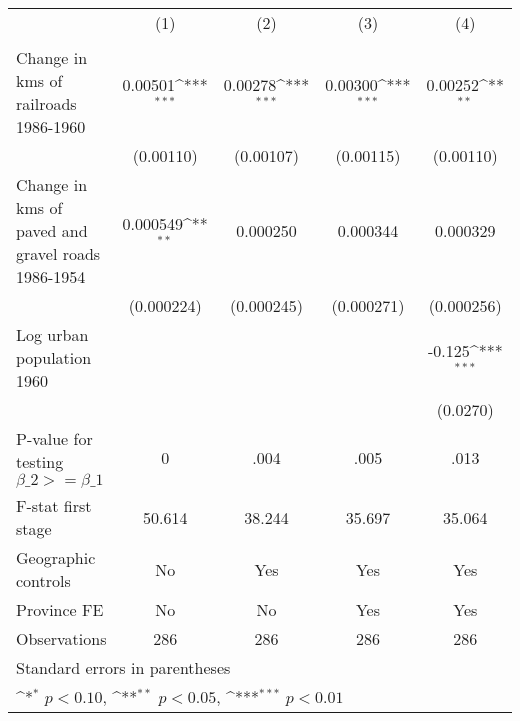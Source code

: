 {
\def\sym#1{\ifmmode^{#1}\else\(^{#1}\)\fi}
\begin{tabular}{l*{4}{c}}
\hline\hline
                &\multicolumn{1}{c}{(1)}&\multicolumn{1}{c}{(2)}&\multicolumn{1}{c}{(3)}&\multicolumn{1}{c}{(4)}\\
                &\multicolumn{1}{c}{}&\multicolumn{1}{c}{}&\multicolumn{1}{c}{}&\multicolumn{1}{c}{}\\
\hline
Change in kms of railroads 1986-1960&  0.00501\sym{***}&  0.00278\sym{***}&  0.00300\sym{***}&  0.00252\sym{**} \\
                &(0.00110)         &(0.00107)         &(0.00115)         &(0.00110)         \\
[1em]
Change in kms of paved and gravel roads 1986-1954& 0.000549\sym{**} & 0.000250         & 0.000344         & 0.000329         \\
                &(0.000224)         &(0.000245)         &(0.000271)         &(0.000256)         \\
[1em]
Log urban population 1960&                  &                  &                  &   -0.125\sym{***}\\
                &                  &                  &                  & (0.0270)         \\
\hline
P-value for testing $\beta\_{2} >= \beta\_{1}$&        0         &     .004         &     .005         &     .013         \\
F-stat first stage&   50.614         &   38.244         &   35.697         &   35.064         \\
Geographic controls&       No         &      Yes         &      Yes         &      Yes         \\
Province FE     &       No         &       No         &      Yes         &      Yes         \\
Observations    &      286         &      286         &      286         &      286         \\
\hline\hline
\multicolumn{5}{l}{\footnotesize Standard errors in parentheses}\\
\multicolumn{5}{l}{\footnotesize \sym{*} \(p<0.10\), \sym{**} \(p<0.05\), \sym{***} \(p<0.01\)}\\
\end{tabular}
}
